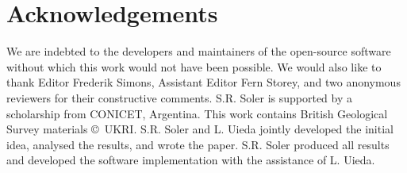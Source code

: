 \section{Acknowledgements}

We are indebted to the developers and maintainers of the open-source software
without which this work would not have been possible.
We would also like to thank Editor Frederik Simons, Assistant Editor Fern
Storey, and two anonymous reviewers for their constructive comments.
S.R. Soler is supported by a scholarship from CONICET, Argentina.
This work contains British Geological Survey materials ©~UKRI.
S.R. Soler and L. Uieda jointly developed the initial idea, analysed the
results, and wrote the paper. S.R. Soler produced all results and developed the
software implementation with the assistance of L. Uieda.
